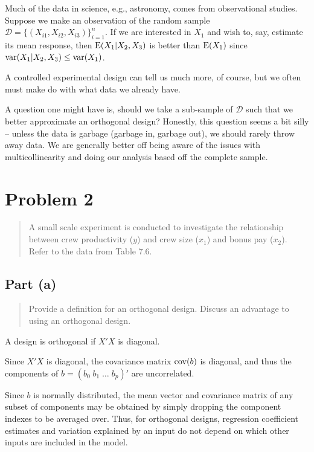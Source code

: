 \documentclass[
]{article}
\begin{document}
Much of the data in science, e.g., astronomy, comes from observational
studies. Suppose we make an observation of the random sample
\(\mathcal{D} = \{(X_{i 1},X_{i 2},X_{i 3})\}_{i=1}^{n}\). If we are
interested in \(X_1\) and wish to, say, estimate its mean response, then
\(\operatorname{E}(X_1|X_2,X_3)\) is better than \(\operatorname{E}(X_1)\) since
\(\operatorname{var}(X_1|X_2,X_3) \leq \operatorname{var}(X_1)\).

A controlled experimental design can tell us much more, of course, but
we often must make do with what data we already have.

A question one might have is, should we take a sub-sample of
\(\mathcal{D}\) such that we better approximate an orthogonal design?
Honestly, this question seems a bit silly -- unless the data is garbage
(garbage in, garbage out), we should rarely throw away data. We are
generally better off being aware of the issues with multicollinearity
and doing our analysis based off the complete sample.

\hypertarget{problem-2}{%
\section{Problem 2}\label{problem-2}}

\begin{quote}
A small scale experiment is conducted to investigate the relationship
between crew productivity (\(y\)) and crew size (\(x_1\)) and bonus pay
(\(x_2\)). Refer to the data from Table 7.6.
\end{quote}

\hypertarget{part-a-1}{%
\subsection{Part (a)}\label{part-a-1}}

\begin{quote}
Provide a definition for an orthogonal design. Discuss an advantage to
using an orthogonal design.
\end{quote}

A design is orthogonal if \(X'X\) is diagonal.

Since \(X'X\) is diagonal, the covariance matrix \(\operatorname{cov}(b)\) is
diagonal, and thus the components of
\(b=(b_0 \; b_1 \; \ldots \; b_p)'\) are uncorrelated.

Since \(b\) is normally distributed, the mean vector and covariance
matrix of any subset of components may be obtained by simply dropping
the component indexes to be averaged over. Thus, for orthogonal designs,
regression coefficient estimates and variation explained by an input do
not depend on which other inputs are included in the model.
\end{document}
